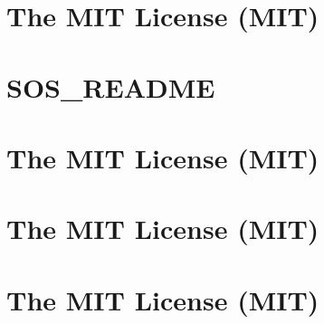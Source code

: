 \documentclass[twoside]{book}
\newcommand{\+}{\discretionary{\mbox{\scriptsize$\hookleftarrow$}}{}{}}
\begin{document}
\chapter{The MIT License (MIT)}
\label{md__d___source_shev4enkoyar__digital_twin__web_client_obj__debug_netcoreapp3_1_linux_x64__pub_tmf5f8e17e03d18ff615bd59027f8aed6b}

\chapter{SOS\+\_\+\+README}
\label{md__d___source_shev4enkoyar__digital_twin__web_client_obj__release_netcoreapp3_1_linux_x64__pub_tmp__out__s_o_s__r_e_a_d_m_e}

\chapter{The MIT License (MIT)}
\label{md__d___source_shev4enkoyar__digital_twin__web_client_obj__release_netcoreapp3_1_linux_x64__pub_c5da5e1fe62a508f59c7ac97742f8a29}

\chapter{The MIT License (MIT)}
\label{md__d___source_shev4enkoyar__digital_twin__web_client_obj__release_netcoreapp3_1_linux_x64__pub_9c253849557fc93019939355c2e39c72}

\chapter{The MIT License (MIT)}
\label{md__d___source_shev4enkoyar__digital_twin__web_client_obj__release_netcoreapp3_1__pub_tmp__out_wbbca2e20dae505fdc2bc3aa09f83c037}

\end{document}
